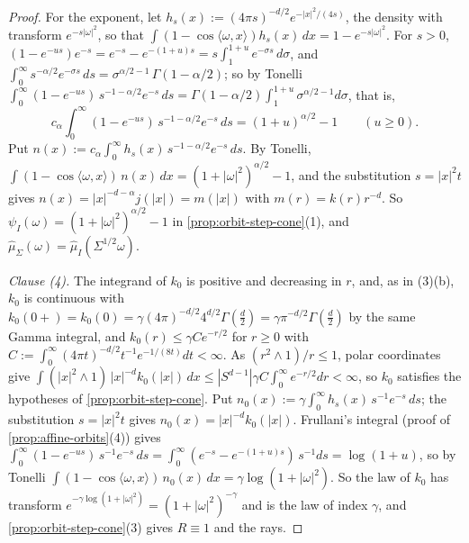 \begin{proof}
For the exponent, let $h_s(x) := (4\pi s)^{-d/2}e^{-|x|^2/(4s)}$, the density with transform
$e^{-s|\omega|^2}$, so that $\int(1 - \cos\langle\omega,x\rangle)h_s(x)\,dx = 1 - e^{-s|\omega|^2}$.
For $s > 0$, $(1 - e^{-us})e^{-s} = e^{-s} - e^{-(1+u)s} = s\int_1^{1+u}e^{-\sigma s}\,d\sigma$, and
$\int_0^\infty s^{-\alpha/2}e^{-\sigma s}\,ds = \sigma^{\alpha/2-1}\,\Gamma(1-\alpha/2)$; so by Tonelli
$\int_0^\infty(1 - e^{-us})\,s^{-1-\alpha/2}e^{-s}\,ds = \Gamma(1-\alpha/2)\int_1^{1+u}
\sigma^{\alpha/2-1}d\sigma$, that is,
\[
  c_\alpha\int_0^\infty(1 - e^{-us})\,s^{-1-\alpha/2}e^{-s}\,ds = (1+u)^{\alpha/2} - 1
  \qquad (u \ge 0).
\]
Put $n(x) := c_\alpha\int_0^\infty h_s(x)\,s^{-1-\alpha/2}e^{-s}\,ds$. By Tonelli,
$\int(1 - \cos\langle\omega,x\rangle)\,n(x)\,dx = (1 + |\omega|^2)^{\alpha/2} - 1$, and the
substitution $s = |x|^2t$ gives $n(x) = |x|^{-d-\alpha}j(|x|) = m(|x|)$ with $m(r) = k(r)r^{-d}$.
So $\psi_I(\omega) = (1 + |\omega|^2)^{\alpha/2} - 1$ in \ref{prop:orbit-step-cone}(1), and
$\widehat\mu_\Sigma(\omega) = \widehat\mu_I(\Sigma^{1/2}\omega)$.

\emph{Clause (4).} The integrand of $k_0$ is positive and decreasing in $r$, and, as in (3)(b),
$k_0$ is continuous with $k_0(0{+}) = k_0(0) = \gamma(4\pi)^{-d/2}4^{d/2}\Gamma(\tfrac d2) =
\gamma\pi^{-d/2}\Gamma(\tfrac d2)$ by the same Gamma integral, and $k_0(r) \le \gamma C e^{-r/2}$ for
$r \ge 0$ with $C := \int_0^\infty(4\pi t)^{-d/2}t^{-1}e^{-1/(8t)}dt < \infty$. As $(r^2 \wedge 1)/r \le 1$,
polar coordinates give $\int(|x|^2 \wedge 1)\,|x|^{-d}k_0(|x|)\,dx \le |S^{d-1}|\gamma C\int_0^\infty
e^{-r/2}dr < \infty$, so $k_0$ satisfies the hypotheses of \ref{prop:orbit-step-cone}. Put
$n_0(x) := \gamma\int_0^\infty h_s(x)\,s^{-1}e^{-s}\,ds$; the substitution $s = |x|^2t$ gives
$n_0(x) = |x|^{-d}k_0(|x|)$. Frullani's integral (proof of \ref{prop:affine-orbits}(4)) gives
$\int_0^\infty(1 - e^{-us})\,s^{-1}e^{-s}\,ds = \int_0^\infty(e^{-s} - e^{-(1+u)s})\,s^{-1}ds =
\log(1+u)$, so by Tonelli $\int(1 - \cos\langle\omega,x\rangle)\,n_0(x)\,dx = \gamma\log(1 + |\omega|^2)$.
So the law of $k_0$ has transform
$e^{-\gamma\log(1 + |\omega|^2)} = (1 + |\omega|^2)^{-\gamma}$ and is the \Matern{} law of index
$\gamma$, and \ref{prop:orbit-step-cone}(3) gives $R \equiv 1$ and the rays.
\end{proof}

